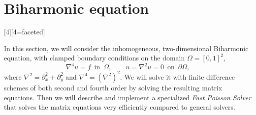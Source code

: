 \section{Biharmonic equation}
\label{sec:PDE}

[4][4=faceted]{  %
}

\newtheorem{theorem}{Theorem}
\newtheorem{lemma}{Lemma}
\theoremstyle{remark}
\newtheorem*{remark}{Remark}

\theoremstyle{definition}
\newtheorem{definition}{Definition}

In this section, we will consider the inhomogeneous, two-dimensional Biharmonic equation, with clamped boundary conditions on the domain $\Omega = [0, 1]^2$,
\begin{equation}\label{eq:PDE}
	\nabla^4 u = f \,\,\, \text{in} \,\,\, \Omega , \qquad u = \nabla^2 u = 0 \,\,\, \text{on} \,\,\, \partial\Omega,
\end{equation}
where $\nabla^2 = \partial_x^2 + \partial_y^2$ and $\nabla^4 = (\nabla^2)^2$.
We will solve it with finite difference schemes of both second and fourth order by solving the resulting matrix equations.
Then we will describe and implement a specialized \emph{Fast Poisson Solver} that solves the matrix equations very efficiently compared to general solvers.

